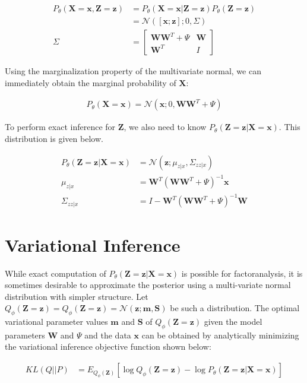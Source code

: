 \documentclass[11pt]{article}
\newcommand{\mbf}[1]{{\mathbf{#1}}}
\begin{document}
\begin{align}
	\label{eq:pxz}
	P_{\theta}(\mbf{X}=\mbf{x}, \mbf{Z}=\mbf{z})&=P_{\theta}(\mbf{X}=\mbf{x}|\mbf{Z}=\mbf{z})P_{\theta}(\mbf{Z}=\mbf{z})\\
	\label{eq:pxz2}
	&=\mathcal{N}([\mbf{x};\mbf{z}]; 0, \Sigma)\\
 	\Sigma &= \begin{bmatrix}
 		\mbf{W}\mbf{W}^T+\Psi  & \mbf{W} \\
		\mbf{W}^T & I
 	\end{bmatrix}
\end{align}

Using the marginalization property of the multivariate normal, 
we can immediately obtain the marginal probability of $\mbf{X}$:

\begin{align}
	\label{eq:px}
 	P_{\theta}(\mbf{X}=\mbf{x})=\mathcal{N}(\mbf{x}; 0, \mbf{W}\mbf{W}^T+\Psi)
\end{align}

To perform exact inference for $\mbf{Z}$, we also need to know
$P_{\theta}(\mbf{Z}=\mbf{z}|\mbf{X}=\mbf{x})$. This distribution 
is given below.

\begin{align}
	\label{eq:pzgx}
 	P_{\theta}(\mbf{Z}=\mbf{z}|\mbf{X}=\mbf{x})&=\mathcal{N}(\mbf{z}; \mu_{z|x}, \Sigma_{zz|x})\\
	\mu_{z|x} &= \mbf{W}^T(\mbf{W}\mbf{W}^T+\Psi)^{-1}\mbf{x}\\
	\Sigma_{zz|x} &= I - \mbf{W}^T(\mbf{W}\mbf{W}^T+\Psi)^{-1}\mbf{W}
\end{align}


\section{Variational Inference}

While exact computation of $P_{\theta}(\mbf{Z}=\mbf{z}|\mbf{X}=\mbf{x})$ is possible for factoranalysis,
it is sometimes desirable to approximate the posterior using a multi-variate normal distribution
with simpler structure. Let $Q_{\phi}(\mbf{Z}=\mbf{z})=Q_{\phi}(\mbf{Z}=\mbf{z})=\mathcal{N}(\mbf{z};\mbf{m},\mbf{S})$ be such a distribution. The optimal variational parameter values $\mbf{m}$ and $\mbf{S}$ of 
$Q_{\phi}(\mbf{Z}=\mbf{z})$ given the model parameters $\mbf{W}$ and $\Psi$ and the data $\mbf{x}$ 
can be obtained by analytically minimizing the variational inference objective function shown below:

\begin{align}
	\label{eq:KLPQ}
	KL(Q||P)&=E_{Q_{\phi}(\mbf{Z})}[\log Q_{\phi}(\mbf{Z}=\mbf{z}) - \log P_{\theta}(\mbf{Z}=\mbf{z}|\mbf{X}=\mbf{x}) ]
\end{align}
\end{document}
